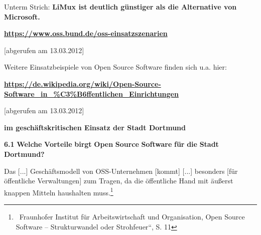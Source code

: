 \documentclass[a4paper]{article}
\newcommand\textstyleInternetlink[1]{\foreignlanguage{english}{\textcolor[rgb]{0.0,0.0,0.5019608}{#1}}}
\begin{document}
{
Unterm Strich: \textbf{LiMux ist deutlich g\"unstiger als die
Alternative von Microsoft.}}



\bigskip

{\centering{}
\href{https://www.oss.bund.de/oss-einsatzszenarien}{\textstyleInternetlink{\textbf{http}}}\href{https://www.oss.bund.de/oss-einsatzszenarien}{\textstyleInternetlink{\textbf{s://www.oss.bund.de/oss-einsatzszenarien}}}
\par}

{\centering{}
[abgerufen am 13.03.2012]
\par}


\bigskip


\bigskip

{
Weitere Einsatzbeispiele von Open Source Software finden sich u.a.
hier:}

{\centering{}
\href{https://de.wikipedia.org/wiki/Open-Source-Software_in_?ffentlichen_Einrichtungen}{\textstyleInternetlink{\textbf{https://de.wikipedia.org/wiki/Open-Source-Software\_in\_\%C3\%B6ffentlichen\_Einrichtungen}}}
\par}

{\centering{}
[abgerufen am 13.03.2012]
\par}


{\bfseries
im gesch\"aftskritischen Einsatz der Stadt Dortmund}


\bigskip


\bigskip

{
\hypertarget{VorteilevonOSSfrdieStadtDortmund}{}\textbf{6.1}\textbf{
}\textbf{Welche}\textbf{ }\textbf{Vorteile}\textbf{
}\textbf{birgt}\textbf{ }\textbf{Open}\textbf{ }\textbf{Source}\textbf{
}\textbf{Software}\textbf{ }\textbf{f\"ur}\textbf{
}\textbf{die}\textbf{ }\textbf{Stadt}\textbf{ }\textbf{Dortmund?}}


\bigskip

{
Das {\guillemotright} [...] Gesch\"aftsmodell von OSS-Unternehmen
[kommt] [...] besonders [f\"ur \"offentliche Verwaltungen] zum Tragen,
da die \"offentliche Hand mit \"au{\ss}erst knappen Mitteln haushalten
muss.{\guillemotleft}\footnote{\ Fraunhofer Institut f\"ur
Arbeitswirtschaft und Organisation, {\quotedblbase}Open Source Software
-- Strukturwandel oder Strohfeuer{\textquotedblleft}, S. 11}}
\end{document}
